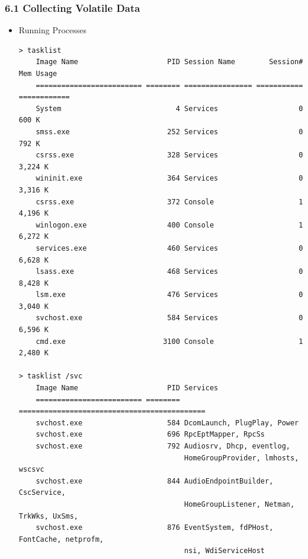 \begin{frame}[fragile]
  \frametitle{6.1 Collecting Volatile Data}
  \begin{itemize}
        \item Running Processes
\begin{lstlisting}[basicstyle=\tiny]
> tasklist
    Image Name                     PID Session Name        Session#    Mem Usage
    ========================= ======== ================ =========== ============
    System                           4 Services                   0        600 K
    smss.exe                       252 Services                   0        792 K
    csrss.exe                      328 Services                   0      3,224 K
    wininit.exe                    364 Services                   0      3,316 K
    csrss.exe                      372 Console                    1      4,196 K
    winlogon.exe                   400 Console                    1      6,272 K
    services.exe                   460 Services                   0      6,628 K
    lsass.exe                      468 Services                   0      8,428 K
    lsm.exe                        476 Services                   0      3,040 K
    svchost.exe                    584 Services                   0      6,596 K
    cmd.exe                       3100 Console                    1      2,480 K

> tasklist /svc
    Image Name                     PID Services
    ========================= ======== ============================================
    svchost.exe                    584 DcomLaunch, PlugPlay, Power
    svchost.exe                    696 RpcEptMapper, RpcSs
    svchost.exe                    792 Audiosrv, Dhcp, eventlog,
                                       HomeGroupProvider, lmhosts, wscsvc
    svchost.exe                    844 AudioEndpointBuilder, CscService,
                                       HomeGroupListener, Netman, TrkWks, UxSms,
    svchost.exe                    876 EventSystem, fdPHost, FontCache, netprofm,
                                       nsi, WdiServiceHost
\end{lstlisting}
    \end{itemize}
\end{frame}


